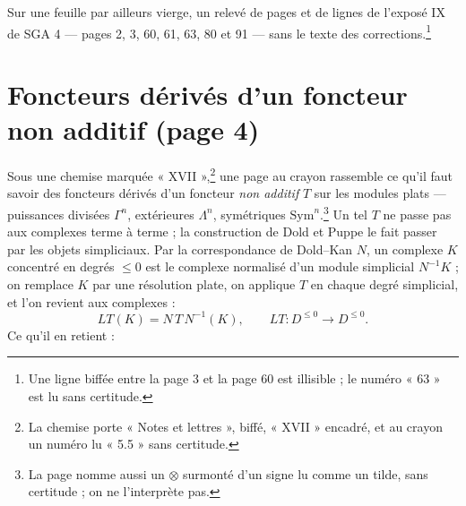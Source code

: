\documentclass[11pt,a4paper]{article}
\begin{document}
Sur une feuille par ailleurs vierge, un relevé de pages et de lignes de
l'exposé IX de SGA 4 --- pages 2, 3, 60, 61, 63, 80 et 91 --- sans le texte
des corrections.\footnote{Une ligne biffée entre la page 3 et la page 60 est
illisible ; le numéro « 63 » est lu sans certitude.}

\section*{Foncteurs dérivés d'un foncteur non additif (page 4)}

Sous une chemise marquée « XVII »,\footnote{La chemise porte « Notes et
lettres », biffé, « XVII » encadré, et au crayon un numéro lu « 5.5 » sans
certitude.} une page au crayon rassemble ce qu'il faut savoir des foncteurs
dérivés d'un foncteur \emph{non additif} $T$ sur les modules plats ---
puissances divisées $\Gamma^n$, extérieures $\Lambda^n$, symétriques
$\mathrm{Sym}^n$.\footnote{La page nomme aussi un $\otimes$ surmonté d'un
signe lu comme un tilde, sans certitude ; on ne l'interprète pas.} Un tel $T$
ne passe pas aux complexes terme à terme ; la construction de Dold et Puppe le
fait passer par les objets simpliciaux. Par la correspondance de Dold--Kan
$N$, un complexe $K$ concentré en degrés $\leqslant 0$ est le complexe
normalisé d'un module simplicial $N^{-1}K$ ; on remplace $K$ par une
résolution plate, on applique $T$ en chaque degré simplicial, et l'on revient
aux complexes :
\[
LT(K) = N\, T\, N^{-1}(K), \qquad LT\colon D^{\leqslant 0} \to D^{\leqslant 0}.
\]
Ce qu'il en retient :
\end{document}
